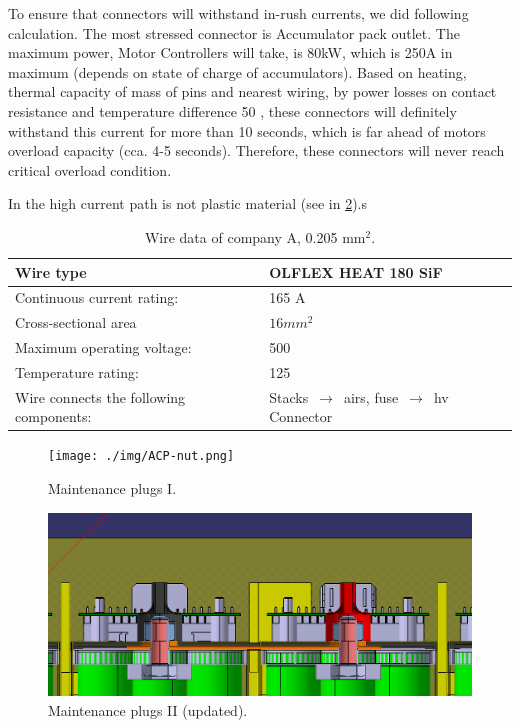 To ensure that connectors will withstand in-rush currents, we did following calculation. The most stressed connector is Accumulator pack outlet. The maximum power, Motor Controllers will take, is 80kW, which is 250A in maximum (depends on state of charge of accumulators). Based on heating, thermal capacity of mass of pins and nearest wiring, by power losses on contact resistance and temperature difference 50 \degC, these connectors will definitely withstand this current for more than 10 seconds, which is far ahead of motors overload capacity (cca. 4-5 seconds). Therefore, these connectors will never reach critical overload condition.

In the high current path is not plastic material  (see in \ref{fig:acp-maintance-plug2}).s

\begin{table}[htbp]
	\centering
	\caption{Wire data of company A, 0.205 mm$^2$.}
	\begin{tabu}{|X|X|}\hline
		Wire type & OLFLEX HEAT 180 SiF \\\hline
		Continuous current rating: & 165 A \\\hline
		Cross-sectional area & $16mm^2$ \\\hline
		Maximum operating voltage: &  500 \vdc\\\hline
		Temperature rating: &  125 \degC\\\hline
		Wire connects the following components: & Stacks $\,\to\,$ \glspl{air}, fuse $\,\to\,$ \gls{hv} Connector \\\hline
	\end{tabu}%
	\label{tab:acc-wire}%
\end{table}%

\begin{figure}[H]
	\centering
	\texttt{[image: ./img/ACP-nut.png]}
	\caption{Maintenance plugs I.}
	\label{fig:acp-maintance-plug}
\end{figure}

\begin{figure}[H]
	\centering
	\includegraphics[width=\textwidth]{./img/ACP-nut2.png}
	\caption{Maintenance plugs II (updated).}
	\label{fig:acp-maintance-plug2}
\end{figure}

